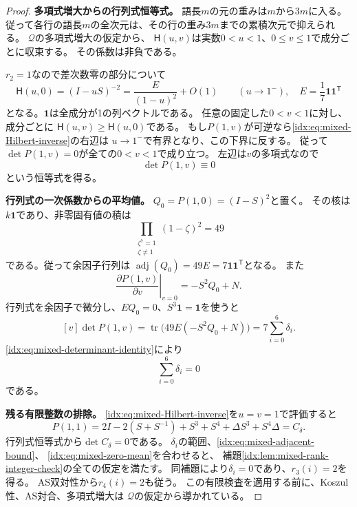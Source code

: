\documentclass[11pt,a4paper]{ltjsarticle}
\theoremstyle{definition}
\begin{document}
\begin{proof}
\par\smallskip\noindent\textbf{多項式増大からの行列式恒等式。}\quad
語長$m$の元の重みは$m$から$3m$に入る。
従って各行の語長$m$の全次元は、その行の重み$3m$までの累積次元で抑えられる。
$\mathcal Q$の多項式増大の仮定から、
$\mathsf H(u,v)$は実数$0<u<1$、$0\leq v\leq1$で成分ごとに収束する。
その係数は非負である。

$r_2=1$なので差次数零の部分について
\[
\mathsf H(u,0)=(I-uS)^{-2}
=\frac{E}{(1-u)^2}+O(1)\qquad(u\longrightarrow1^-),
\quad
E=\frac17\mathbf1\mathbf1^{\mathsf T}
\]
となる。$\mathbf1$は全成分が1の列ベクトルである。
任意の固定した$0<v<1$に対し、成分ごとに
$\mathsf H(u,v)\geq\mathsf H(u,0)$である。
もし$P(1,v)$が可逆なら\eqref{idx:eq:mixed-Hilbert-inverse}の右辺は
$u\to1^-$で有界となり、この下界に反する。
従って$\det P(1,v)=0$が全ての$0<v<1$で成り立つ。
左辺は$v$の多項式なので
\begin{equation}\label{idx:eq:mixed-determinant-identity}
\det P(1,v)\equiv0
\end{equation}
という恒等式を得る。

\par\smallskip\noindent\textbf{行列式の一次係数からの平均値。}\quad
$Q_0=P(1,0)=(I-S)^2$と置く。
その核は$k\mathbf1$であり、非零固有値の積は
\[
\prod_{\substack{\zeta^7=1\\\zeta\ne1}}(1-\zeta)^2=49
\]
である。従って余因子行列は
$\operatorname{adj}(Q_0)=49E=7\mathbf1\mathbf1^{\mathsf T}$となる。
また
\[
\left.\frac{\partial P(1,v)}{\partial v}\right|_{v=0}
=-S^2Q_0+N.
\]
行列式を余因子で微分し、$EQ_0=0$、$S^3\mathbf1=\mathbf1$を使うと
\[
[v]\det P(1,v)
=\operatorname{tr}\bigl(49E(-S^2Q_0+N)\bigr)
=7\sum_{i=0}^6\delta_i.
\]
\eqref{idx:eq:mixed-determinant-identity}により
\begin{equation}\label{idx:eq:mixed-zero-mean}
\sum_{i=0}^6\delta_i=0
\end{equation}
である。

\par\smallskip\noindent\textbf{残る有限整数の排除。}\quad
\eqref{idx:eq:mixed-Hilbert-inverse}を$u=v=1$で評価すると
\[
P(1,1)=2I-2(S+S^{-1})+S^3+S^4
       +\Delta S^3+S^4\Delta
       =C_\delta.
\]
行列式恒等式から$\det C_\delta=0$である。
$\delta_i$の範囲、\eqref{idx:eq:mixed-adjacent-bound}、
\eqref{idx:eq:mixed-zero-mean}を合わせると、
補題\ref{idx:lem:mixed-rank-integer-check}の全ての仮定を満たす。
同補題により$\delta_i=0$であり、$r_3(i)=2$を得る。
AS双対性から$r_4(i)=2$も従う。
この有限検査を適用する前に、Koszul性、AS対合、多項式増大は
$\mathcal Q$の仮定から導かれている。
\end{proof}
\end{document}
